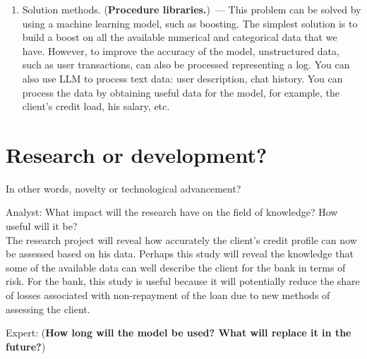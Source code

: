 \documentclass[12pt]{article}
\begin{document}
\begin{enumerate}
\item Solution methods. (\textbf{Procedure libraries.})~--- This problem can be solved by using a machine learning model, such as boosting. The simplest solution is to build a boost on all the available numerical and categorical data that we have. However, to improve the accuracy of the model, unstructured data, such as user transactions, can also be processed representing a log. You can also use LLM to process text data: user description, chat history. You can  process the data by obtaining useful data for the model, for example, the client's credit load, his salary, etc. 
\end{enumerate}

\section{Research or development?}
In other words, novelty or technological advancement?

{Analyst:} What impact will the research have on the field of knowledge? How useful will it be? \\
The research project will reveal how accurately the client's credit profile can now be assessed based on his data. Perhaps this study will reveal the knowledge that some of the available data can well describe the client for the bank in terms of risk. For the bank, this study is useful because it will potentially reduce the share of losses associated with non-repayment of the loan due to new methods of assessing the client. 

{Expert:} (\textbf{How long will the model be used? What will replace it in the future?})

%
%
\end{document}
